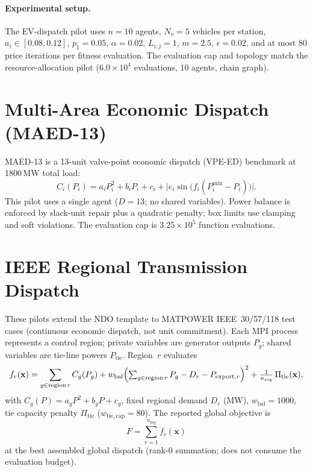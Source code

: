 \paragraph{Experimental setup.}
The EV-dispatch pilot uses $n{=}10$ agents, $N_v{=}5$ vehicles per station, $a_i\in[0.08,0.12]$, $p_1{=}0.05$, $\alpha{=}0.02$, $L_{i,j}{=}1$, $m{=}2.5$, $\epsilon{=}0.02$, and at most 80 price iterations per fitness evaluation. The evaluation cap and topology match the resource-allocation pilot ($6.0\times10^4$ evaluations, 10 agents, chain graph).

\section{Multi-Area Economic Dispatch (MAED-13)}\label{app:maed}
MAED-13 is a 13-unit valve-point economic dispatch (VPE-ED) benchmark at 1800\,MW total load:
\begin{equation}
C_i(P_i)=a_i P_i^2+b_i P_i+c_i+\bigl|e_i\sin\bigl(f_i(P_i^{\min}-P_i)\bigr)\bigr|.
\label{eq:app_maed}
\end{equation}
This pilot uses a single agent ($D{=}13$; no shared variables). Power balance is enforced by slack-unit repair plus a quadratic penalty; box limits use clamping and soft violations. The evaluation cap is $3.25\times10^5$ function evaluations.

\section{IEEE Regional Transmission Dispatch}\label{app:ieee}\label{app:ieee_partition}
These pilots extend the NDO template to MATPOWER IEEE~30/57/118 test cases (continuous economic dispatch, not unit commitment). Each MPI process represents a control region; private variables are generator outputs $P_g$; shared variables are tie-line powers $P_{\mathrm{tie}}$. Region~$r$ evaluates
\begin{equation}
f_r(\mathbf{x})=
\sum_{g\in\mathrm{region}\,r} C_g(P_g)
+ w_{\mathrm{bal}}\Bigl(\textstyle\sum_{g\in\mathrm{region}\,r} P_g - D_r - P_{\mathrm{export},r}\Bigr)^2
+ \frac{1}{n_{\mathrm{reg}}}\,\Pi_{\mathrm{tie}}(\mathbf{x}),
\label{eq:app_ieee_local}
\end{equation}
with $C_g(P)=a_g P^2+b_g P+c_g$, fixed regional demand $D_r$ (MW), $w_{\mathrm{bal}}{=}1000$, tie capacity penalty $\Pi_{\mathrm{tie}}$ ($w_{\mathrm{tie,cap}}{=}80$). The reported global objective is
\begin{equation}
F=\sum_{r=1}^{n_{\mathrm{reg}}} f_r(\mathbf{x})
\label{eq:app_ieee_global}
\end{equation}
at the best assembled global dispatch (rank-0 summation; does not consume the evaluation budget).

